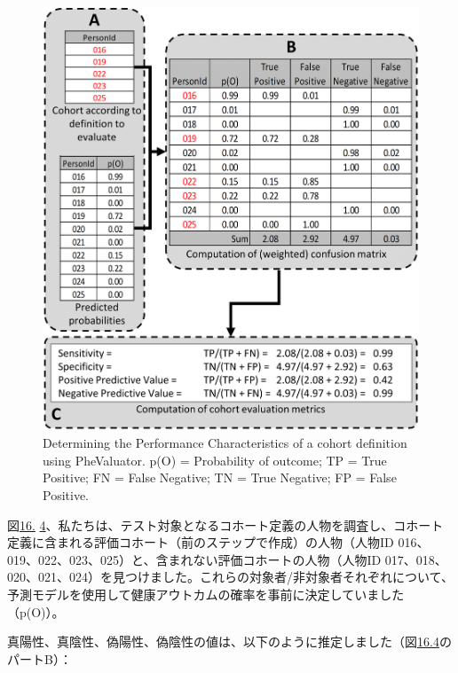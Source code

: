\documentclass[
  11pt]{book}
\theoremstyle{definition}
\theoremstyle{definition}
\theoremstyle{definition}
\theoremstyle{definition}
\theoremstyle{remark}
\begin{document}
\begin{figure}

{\centering \includegraphics[width=1\linewidth]{images/ClinicalValidity/PheValuatorEvaluation} 

}

\caption{Determining the Performance Characteristics of a cohort definition using PheValuator. p(O) = Probability of outcome; TP = True Positive; FN = False Negative; TN = True Negative; FP = False Positive.}\label{fig:phevaluatorDiagram}
\end{figure}

図\href{https://ohdsi.github.io/TheBookOfOhdsi/ClinicalValidity.html\#fig:phevaluatorDiagram}{16.} \href{https://ohdsi.github.io/TheBookOfOhdsi/ClinicalValidity.html\#fig:phevaluatorDiagram}{4}、私たちは、テスト対象となるコホート定義の人物を調査し、コホート定義に含まれる評価コホート（前のステップで作成）の人物（人物ID 016、019、022、023、025）と、含まれない評価コホートの人物（人物ID 017、018、020、021、024）を見つけました。これらの対象者/非対象者それぞれについて、予測モデルを使用して健康アウトカムの確率を事前に決定していました（p(O)）。

真陽性、真陰性、偽陽性、偽陰性の値は、以下のように推定しました（図\href{https://ohdsi.github.io/TheBookOfOhdsi/ClinicalValidity.html\#fig:phevaluatorDiagram}{16.4}のパートB）：
\end{document}
